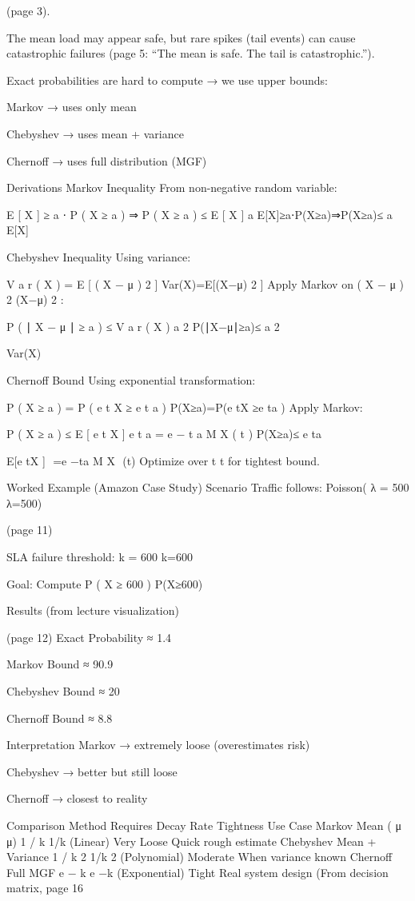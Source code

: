  (page 3).

The mean load may appear safe, but rare spikes (tail events) can cause catastrophic failures (page 5: “The mean is safe. The tail is catastrophic.”).

Exact probabilities are hard to compute → we use upper bounds:

Markov → uses only mean

Chebyshev → uses mean + variance

Chernoff → uses full distribution (MGF)

Derivations
Markov Inequality
From non-negative random variable:

E
[
X
]
≥
a
⋅
P
(
X
≥
a
)
⇒
P
(
X
≥
a
)
≤
E
[
X
]
a
E[X]≥a⋅P(X≥a)⇒P(X≥a)≤ 
a
E[X]
​
 
Chebyshev Inequality
Using variance:

V
a
r
(
X
)
=
E
[
(
X
−
μ
)
2
]
Var(X)=E[(X−μ) 
2
 ]
Apply Markov on 
(
X
−
μ
)
2
(X−μ) 
2
 :

P
(
∣
X
−
μ
∣
≥
a
)
≤
V
a
r
(
X
)
a
2
P(∣X−μ∣≥a)≤ 
a 
2
 
Var(X)
​
 
Chernoff Bound
Using exponential transformation:

P
(
X
≥
a
)
=
P
(
e
t
X
≥
e
t
a
)
P(X≥a)=P(e 
tX
 ≥e 
ta
 )
Apply Markov:

P
(
X
≥
a
)
≤
E
[
e
t
X
]
e
t
a
=
e
−
t
a
M
X
(
t
)
P(X≥a)≤ 
e 
ta
 
E[e 
tX
 ]
​
 =e 
−ta
 M 
X
​
 (t)
Optimize over 
t
t for tightest bound.

Worked Example (Amazon Case Study)
Scenario
Traffic follows: Poisson(
λ
=
500
λ=500) 

 (page 11)

SLA failure threshold: 
k
=
600
k=600

Goal: Compute 
P
(
X
≥
600
)
P(X≥600)

Results (from lecture visualization) 

 (page 12)
Exact Probability ≈ 1.4%

Markov Bound ≈ 90.9%

Chebyshev Bound ≈ 20%

Chernoff Bound ≈ 8.8%

Interpretation
Markov → extremely loose (overestimates risk)

Chebyshev → better but still loose

Chernoff → closest to reality

Comparison
Method	Requires	Decay Rate	Tightness	Use Case
Markov	Mean (
μ
μ)	
1
/
k
1/k (Linear)	Very Loose	Quick rough estimate
Chebyshev	Mean + Variance	
1
/
k
2
1/k 
2
  (Polynomial)	Moderate	When variance known
Chernoff	Full MGF	
e
−
k
e 
−k
  (Exponential)	Tight	Real system design
(From decision matrix, page 16 

